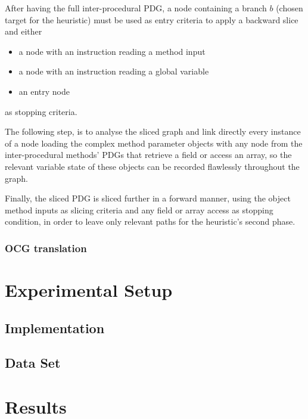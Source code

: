 \documentclass[%
  chapterprefix=false,%
  open=right,%
  twoside=true,%
  paper=a4,%
  logofile={Figures/logo.png},%
  thesistype=master,%
  UKenglish,%
]{se2thesis}
\begin{document}
After having the full inter-procedural PDG, a node containing a branch \(b\) (chosen target for the heuristic) must be used as entry criteria to apply a backward slice and either

\begin{itemize}
  \item a node with an instruction reading a method input
  \item a node with an instruction reading a global variable
  \item an entry node 
\end{itemize}

as stopping criteria.

The following step, is to analyse the sliced graph and link directly every instance of a node loading the complex method parameter objects with any node from the inter-procedural methods' PDGs that retrieve a field or access an array, so the relevant variable state of these objects can be recorded flawlessly throughout the graph.

Finally, the sliced PDG is sliced further in a forward manner, using the object method inputs as slicing criteria and any field or array access as stopping condition, in order to leave only relevant paths for the heuristic's second phase.

\subsection{OCG translation}

\chapter{Experimental Setup}


\section{Implementation}


\section{Data Set}


\chapter{Results}
\end{document}
